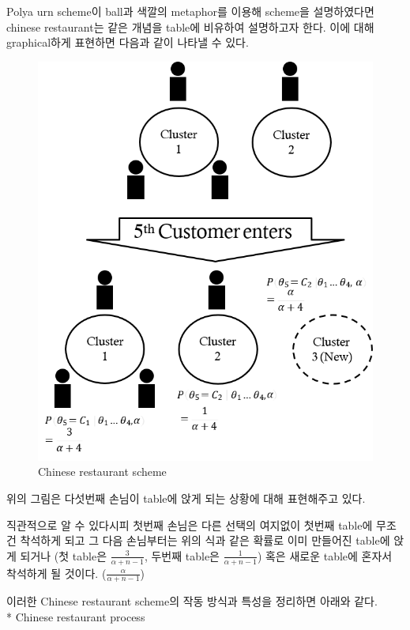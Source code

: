 \documentclass[a4paper]{oblivoir}
\begin{document}
Polya urn scheme이 ball과 색깔의 metaphor를 이용해 scheme을 설명하였다면 chinese restaurant는 같은 개념을 table에 비유하여 설명하고자 한다. 이에 대해 graphical하게 표현하면 다음과 같이 나타낼 수 있다. \\
\begin{figure}[ht] \centering 
\includegraphics[scale=0.7]{fig13_6.png} 
\caption{Chinese restaurant scheme}
\label{fig:13-6}
\end{figure}
위의 그림은 다섯번째 손님이 table에 앉게 되는 상황에 대해 표현해주고 있다.

직관적으로 알 수 있다시피 첫번째 손님은 다른 선택의 여지없이 첫번째 table에 무조건 착석하게 되고 그 다음 손님부터는 위의 식과 같은 확률로 이미 만들어진 table에 앉게 되거나 (첫 table은 $\frac{3}{\alpha+n-1}$, 두번째 table은 $\frac{1}{\alpha+n-1}$) 혹은 새로운 table에 혼자서 착석하게 될 것이다. ($\frac{\alpha}{\alpha+n-1}$) 

이러한 Chinese restaurant scheme의 작동 방식과 특성을 정리하면 아래와 같다.\\

* Chinese restaurant process
\end{document}

